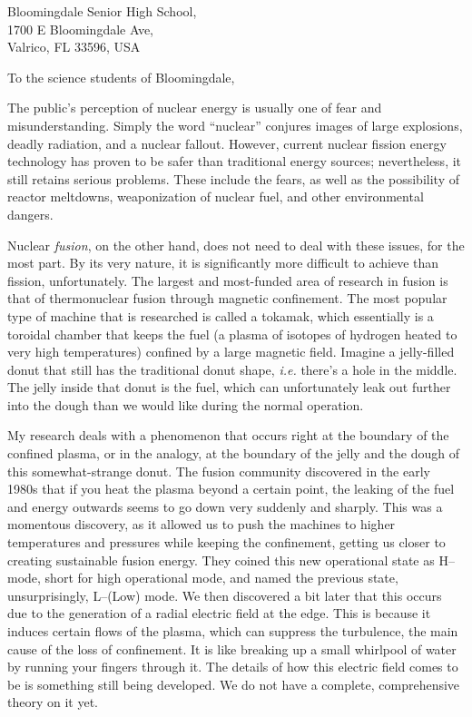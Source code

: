 \documentclass[12pt,a4paper]{letter}
\date{\today}
\begin{document}
\begin{letter}{
	Bloomingdale Senior High School,\\
	1700 E Bloomingdale Ave,\\
	Valrico, FL 33596, USA
}

\opening{To the science students of Bloomingdale,}


The public's perception of nuclear energy is usually one of fear and misunderstanding.
Simply the word ``nuclear'' conjures images of large explosions, deadly radiation, and a nuclear fallout.
However, current nuclear fission energy technology has proven to be safer than traditional energy sources; nevertheless, it still retains serious problems.
These include the fears, as well as the possibility of reactor meltdowns, weaponization of nuclear fuel, and other environmental dangers. 

Nuclear \emph{fusion}, on the other hand, does not need to deal with these issues, for the most part.
By its very nature, it is significantly more difficult to achieve than fission, unfortunately.
The largest and most-funded area of research in fusion is that of thermonuclear fusion through magnetic confinement.
The most popular type of machine that is researched is called a tokamak, which essentially is a toroidal chamber that keeps the fuel (a plasma of isotopes of hydrogen heated to very high temperatures) confined by a large magnetic field.
Imagine a jelly-filled donut that still has the traditional donut shape, \emph{i.e.} there's a hole in the middle.
The jelly inside that donut is the fuel, which can unfortunately leak out further into the dough than we would like during the normal operation.

My research deals with a phenomenon that occurs right at the boundary of the confined plasma, or in the analogy, at the boundary of the jelly and the dough of this somewhat-strange donut.
The fusion community discovered in the early 1980s that if you heat the plasma beyond a certain point, the leaking of the fuel and energy outwards seems to go down very suddenly and sharply.
This was a momentous discovery, as it allowed us to push the machines to higher temperatures and pressures while keeping the confinement, getting us closer to creating sustainable fusion energy.
They coined this new operational state as H--mode, short for high operational mode, and named the previous state, unsurprisingly, L--(Low) mode.
We then discovered a bit later that this occurs due to the generation of a radial electric field at the edge.
This is because it induces certain flows of the plasma, which can suppress the turbulence, the main cause of the loss of confinement.
It is like breaking up a small whirlpool of water by running your fingers through it.
The details of how this electric field comes to be is something still being developed.
We do not have a complete, comprehensive theory on it yet.


\end{letter}
\end{document}
